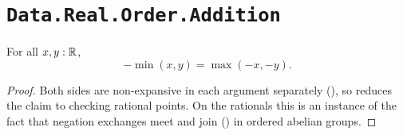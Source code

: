 \section{\texttt{Data.Real.Order.Addition}}


\begin{lemma}
  \label{negDistMinReal}
  For all $x, y : \mathbb{R}$,
  \[
    -\min(x, y) = \max(-x, -y).
  \]
\end{lemma}
\begin{proof}
  Both sides are non-expansive in each argument separately (), so  reduces the claim to checking rational points. On the rationals this is an instance of the fact that negation exchanges meet and join () in ordered abelian groups.
\end{proof}


